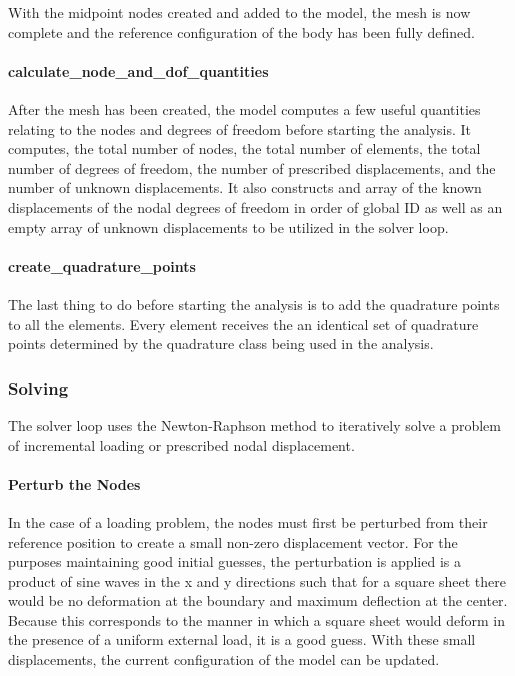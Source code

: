\documentclass[]{spie}  %
\begin{document}
With the midpoint nodes created and added to the model, the mesh is now complete and the reference configuration of the body has been fully defined. 

\paragraph{calculate\_node\_and\_dof\_quantities}
After the mesh has been created, the model computes a few useful quantities relating to the nodes and degrees of freedom before starting the analysis. It computes, the total number of nodes, the total number of elements, the total number of degrees of freedom, the number of prescribed displacements, and the number of unknown displacements. It also constructs and array of the known displacements of the nodal degrees of freedom in order of global ID as well as an empty array of unknown displacements to be utilized in the solver loop. 

\paragraph{create\_quadrature\_points}
The last thing to do before starting the analysis is to add the quadrature points to all the elements. Every element receives the an identical set of quadrature points determined by the quadrature class being used in the analysis.

\subsubsection{Solving}
The solver loop uses the Newton-Raphson method to iteratively solve a problem of incremental loading or prescribed nodal displacement.

\paragraph{Perturb the Nodes} 
In the case of a loading problem, the nodes must first be perturbed from their reference position to create a small non-zero displacement vector. For the purposes maintaining good initial guesses, the perturbation is applied is a product of sine waves in the x and y directions such that for a square sheet there would be no deformation at the boundary and maximum deflection at the center. Because this corresponds to the manner in which a square sheet would deform in the presence of a uniform external load, it is a good guess. With these small displacements, the current configuration of the model can be updated. 
\end{document}
